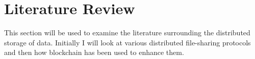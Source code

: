 
\chapter{Literature Review}\label{ch:lit-review}

This section will be used to examine the literature surrounding the distributed storage of data. Initially I will look at various distributed file-sharing protocols and then how blockchain has been used to enhance them.


